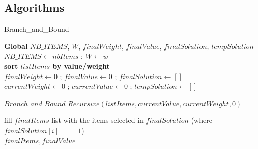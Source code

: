 \documentclass[a4paper, 11pt]{article}
\begin{document}
\subsection{Algorithms}
\begin{algorithm}[hbt!]
    \caption{Branch\_and\_Bound}\label{alg:two}
    
    \BlankLine
    \textbf{Global} $NB\_ITEMS$, $W$, $finalWeight$, $finalValue$, $finalSolution$, $tempSolution$\\
    
    \BlankLine
    $NB\_ITEMS \leftarrow nbItems$ ; 
    $W \leftarrow w$\\
    \textbf{sort $listItems$ by value/weight}\\
    $finalWeight \leftarrow 0$ ; 
    $finalValue \leftarrow 0$ ; 
    $finalSolution \leftarrow []$\\
    $currentWeight \leftarrow 0$ ; 
    $currentValue \leftarrow 0$ ; 
    $tempSolution \leftarrow []$\\
    
    \BlankLine
    $Branch\_and\_Bound\_Recursive(listItems,currentValue, currentWeight, 0)$
    
    \BlankLine
    fill $finalItems$ list with the items selected in $finalSolution$ (where $finalSolution[i] == 1$)\\
    \Return $finalItems, finalValue$
    
    
\end{algorithm}
\end{document}

